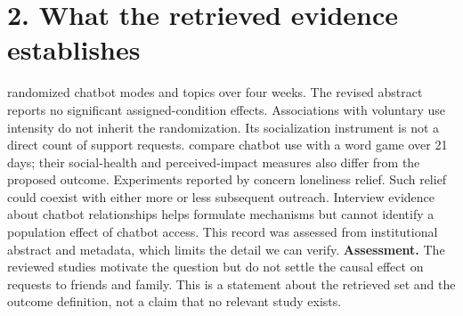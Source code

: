 \documentclass[11pt]{article}
\begin{document}
\section*{2. What the retrieved evidence establishes}
\citet{fang2025} randomized chatbot modes and topics over four weeks. The revised abstract reports no significant assigned-condition effects. Associations with voluntary use intensity do not inherit the randomization. Its socialization instrument is not a direct count of support requests. \citet{guingrich2025} compare chatbot use with a word game over 21 days; their social-health and perceived-impact measures also differ from the proposed outcome.
Experiments reported by \citet{defreitas2025} concern loneliness relief. Such relief could coexist with either more or less subsequent outreach. Interview evidence about chatbot relationships \citep{skjuve2021} helps formulate mechanisms but cannot identify a population effect of chatbot access. This record was assessed from institutional abstract and metadata, which limits the detail we can verify.
\textbf{Assessment.} The reviewed studies motivate the question but do not settle the causal effect on requests to friends and family. This is a statement about the retrieved set and the outcome definition, not a claim that no relevant study exists.
\newpage
\end{document}
